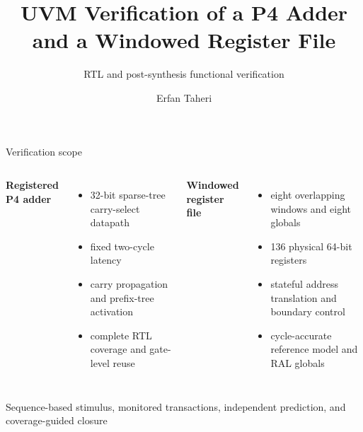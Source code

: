 \documentclass[aspectratio=169,11pt]{beamer}
\title{UVM Verification of a P4 Adder\\and a Windowed Register File}
\subtitle{RTL and post-synthesis functional verification}
\author{Erfan Taheri}
\date{}
\begin{document}
\begin{frame}[plain]
  \vfill
  \titlepage
  \vfill
\end{frame}

\begin{frame}{Verification scope}
\begin{columns}[T,onlytextwidth]
  {\color{teal}\large\bfseries Registered P4 adder}\par\vspace{0.45em}
  \begin{itemize}
    \item 32-bit sparse-tree carry-select datapath
    \item fixed two-cycle latency
    \item carry propagation and prefix-tree activation
    \item complete RTL coverage and gate-level reuse
  \end{itemize}
  {\color{teal}\large\bfseries Windowed register file}\par\vspace{0.45em}
  \begin{itemize}
    \item eight overlapping windows and eight globals
    \item 136 physical 64-bit registers
    \item stateful address translation and boundary control
    \item cycle-accurate reference model and RAL globals
  \end{itemize}
\end{columns}
\vspace{0.7em}
\centering
{\color{muted}Sequence-based stimulus, monitored transactions, independent prediction, and coverage-guided closure}
\end{frame}
\end{document}
